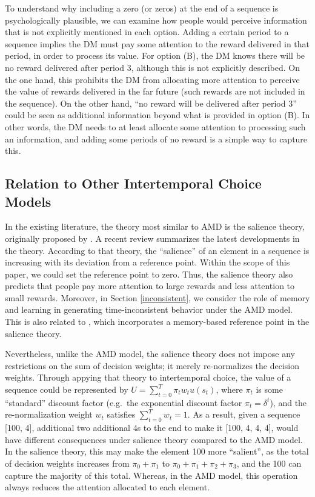 \documentclass[
  12pt,
]{article}
\begin{document}
To understand why including a zero (or zeros) at the end of a sequence
is psychologically plausible, we can examine how people would perceive
information that is not explicitly mentioned in each option. Adding a
certain period to a sequence implies the DM must pay some attention to
the reward delivered in that period, in order to process its value. For
option (B), the DM knows there will be no reward delivered after period
3, although this is not explicitly described. On the one hand, this
prohibits the DM from allocating more attention to perceive the value of
rewards delivered in the far future (such rewards are not included in
the sequence). On the other hand, ``no reward will be delivered after
period 3'' could be seen as additional information beyond what is
provided in option (B). In other words, the DM needs to at least
allocate some attention to processing such an information, and adding
some periods of no reward is a simple way to capture this.

\hypertarget{relation-to-other-intertemporal-choice-models}{%
\subsection{Relation to Other Intertemporal Choice
Models}\label{relation-to-other-intertemporal-choice-models}}

In the existing literature, the theory most similar to AMD is the
salience theory, originally proposed by \citet{bordalo2012salience}. A
recent review \citep{bordalo2022salience} summarizes the latest
developments in the theory. According to that theory, the ``salience''
of an element in a sequence is increasing with its deviation from a
reference point. Within the scope of this paper, we could set the
reference point to zero. Thus, the salience theory also predicts that
people pay more attention to large rewards and less attention to small
rewards. Moreover, in Section \ref{inconsistent}, we consider the role
of memory and learning in generating time-inconsistent behavior under
the AMD model. This is also related to \citet{bordalo2020memory}, which
incorporates a memory-based reference point in the salience theory.

Nevertheless, unlike the AMD model, the salience theory does not impose
any restrictions on the sum of decision weights; it merely re-normalizes
the decision weights. Through appying that theory to intertemporal
choice, the value of a sequence could be represented by
\(U=\sum_{t=0}^T \pi_tw_tu(s_t)\), where \(\pi_t\) is some ``standard''
discount factor (e.g.~the exponential discount factor
\(\pi_t=\delta^t\)), and the re-normalization weight \(w_t\) satisfies
\(\sum_{t=0}^T w_t=1\). As a result, given a sequence {[}100, 4{]},
additional two additional 4s to the end to make it {[}100, 4, 4, 4{]},
would have different consequences under salience theory compared to the
AMD model. In the salience theory, this may make the element 100 more
``salient'', as the total of decision weights increases from
\(\pi_0 + \pi_1\) to \(\pi_0 + \pi_1 + \pi_2 + \pi_3\), and the 100 can
capture the majority of this total. Whereas, in the AMD model, this
operation always reduces the attention allocated to each element.
\end{document}
